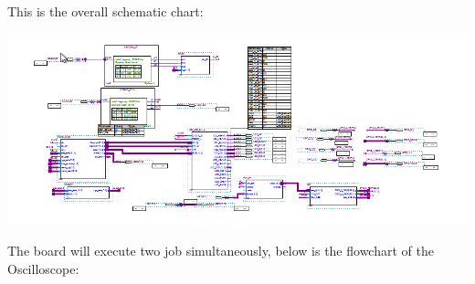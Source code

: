 \documentclass[11pt]{scrartcl}
\begin{document}
This is the overall schematic chart:
\begin{center}
\begin{minipage}[t]{\linewidth}

{
\includegraphics[scale = 0.5]{schematic.png}
}
\end{minipage}
\medskip
\end{center}

The board will execute two job simultaneously, below is the flowchart of the Oscilloscope:
\end{document}
